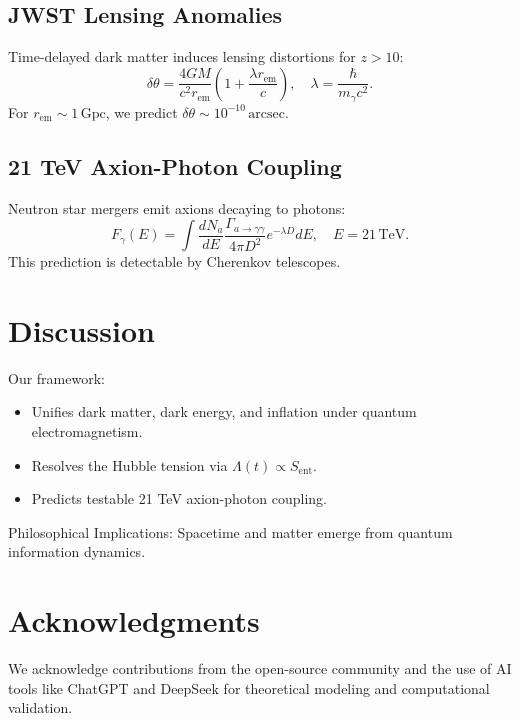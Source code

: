 \documentclass[12pt,a4paper]{article}
\begin{document}
\subsection{JWST Lensing Anomalies}
Time-delayed dark matter induces lensing distortions for $z > 10$:
\[
\delta\theta = \frac{4GM}{c^2 r_{\text{em}}} \left( 1 + \frac{\lambda r_{\text{em}}}{c} \right), \quad \lambda = \frac{\hbar}{m_\gamma c^2}.
\]
For $r_{\text{em}} \sim 1 \, \text{Gpc}$, we predict $\delta\theta \sim 10^{-10} \, \text{arcsec}$.

\subsection{21 TeV Axion-Photon Coupling}
Neutron star mergers emit axions decaying to photons:
\[
F_\gamma(E) = \int \frac{dN_a}{dE} \frac{\Gamma_{a \to \gamma\gamma}}{4\pi D^2} e^{-\lambda D} dE, \quad E = 21 \, \text{TeV}.
\]
This prediction is detectable by Cherenkov telescopes.

\section{Discussion}
Our framework:
\begin{itemize}
    \item Unifies dark matter, dark energy, and inflation under quantum electromagnetism.
    \item Resolves the Hubble tension via $\Lambda(t) \propto S_{\text{ent}}$.
    \item Predicts testable 21 TeV axion-photon coupling.
\end{itemize}

Philosophical Implications: Spacetime and matter emerge from quantum information dynamics.

\section*{Acknowledgments}
We acknowledge contributions from the open-source community and the use of AI tools like ChatGPT and DeepSeek for theoretical modeling and computational validation.
\end{document}
